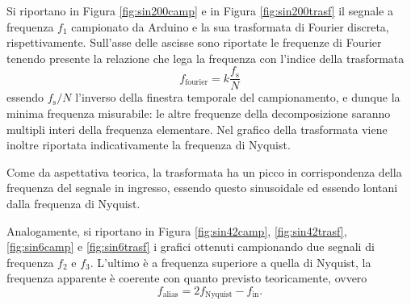 \documentclass[10pt,oneside,a4paper]{article}
\newenvironment{Figure}
  {\par\medskip\noindent\minipage{\linewidth}}
  {\endminipage\par\medskip}
\begin{document}
\begin{multicols}{2}
Si riportano in Figura \ref{fig:sin200camp} e in Figura \ref{fig:sin200trasf} il segnale a frequenza $f_1$ campionato da Arduino e la sua trasformata di Fourier discreta, rispettivamente. Sull'asse delle ascisse sono riportate le frequenze di Fourier tenendo presente la relazione che lega la frequenza con l'indice della trasformata
\begin{equation}\label{eq:frequenzeFourier}
	f_\text{fourier} = k \frac{f_\text{s}}{N}
\end{equation}
essendo $f_\text{s}/N$ l'inverso della finestra temporale del campionamento, e dunque la minima frequenza misurabile: le altre frequenze della decomposizione saranno multipli interi della frequenza elementare.
Nel grafico della trasformata viene inoltre riportata indicativamente la frequenza di Nyquist.

%

Come da aspettativa teorica, la trasformata ha un picco in corrispondenza della frequenza del segnale in ingresso, essendo questo sinusoidale ed essendo lontani dalla frequenza di Nyquist.

Analogamente, si riportano in Figura \ref{fig:sin42camp}, \ref{fig:sin42trasf}, \ref{fig:sin6camp} e \ref{fig:sin6trasf} i grafici ottenuti campionando due segnali di frequenza $f_2$ e $f_3$. L'ultimo è a frequenza superiore a quella di Nyquist, la frequenza apparente è coerente con quanto previsto teoricamente, ovvero
\begin{equation}\label{eq:frequenzaAlias}
	f_\text{alias} = 2f_\text{Nyquist} - f_\text{in}.
\end{equation}


\end{multicols}
\end{document}
